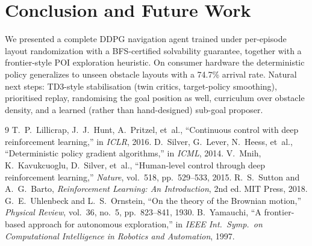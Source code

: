 \documentclass[11pt,a4paper]{article}
\newcommand{\EvalRate}{74.7\%}
\begin{document}
\section{Conclusion and Future Work}
We presented a complete DDPG navigation agent trained under per-episode layout
randomization with a BFS-certified solvability guarantee, together with a
frontier-style POI exploration heuristic. On consumer hardware the
deterministic policy generalizes to unseen obstacle layouts with a
\EvalRate{} arrival rate. Natural next steps: TD3-style stabilisation (twin
critics, target-policy smoothing), prioritised replay, randomising the goal
position as well, curriculum over obstacle density, and a learned (rather than
hand-designed) sub-goal proposer.

\begin{thebibliography}{9}
 T.~P.~Lillicrap, J.~J.~Hunt, A.~Pritzel, et~al.,
``Continuous control with deep reinforcement learning,'' in \emph{ICLR}, 2016.
 D.~Silver, G.~Lever, N.~Heess, et~al.,
``Deterministic policy gradient algorithms,'' in \emph{ICML}, 2014.
 V.~Mnih, K.~Kavukcuoglu, D.~Silver, et~al.,
``Human-level control through deep reinforcement learning,''
\emph{Nature}, vol.~518, pp.~529--533, 2015.
 R.~S.~Sutton and A.~G.~Barto,
\emph{Reinforcement Learning: An Introduction}, 2nd ed. MIT Press, 2018.
 G.~E.~Uhlenbeck and L.~S.~Ornstein,
``On the theory of the Brownian motion,''
\emph{Physical Review}, vol.~36, no.~5, pp.~823--841, 1930.
 B.~Yamauchi,
``A frontier-based approach for autonomous exploration,'' in
\emph{IEEE Int.\ Symp.\ on Computational Intelligence in Robotics and
Automation}, 1997.
\end{thebibliography}
\end{document}
